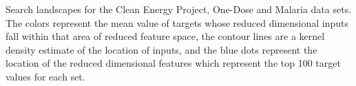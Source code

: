 Search landscapes for the Clean Energy Project, One-Dose and Malaria data sets.  
The colors represent the mean value of targets whose reduced dimensional inputs fall within that area of reduced feature space,
the contour lines are a kernel density estimate of the location of inputs, and the blue dots represent the location of the reduced
dimensional features which represent the top 100 target values for each set.
\label{fig:info_landscapes}
